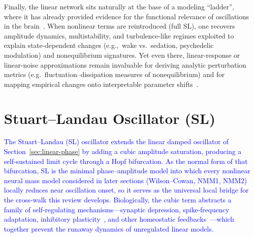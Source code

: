 \documentclass[12pt]{article}
\numberwithin{equation}{section}
\newcommand{\rev}[1]{\textcolor{blue}{#1}}
\begin{document}
Finally, the linear network sits naturally at the base of a modeling “ladder”, where it has already provided evidence for the functional relevance of oscillations in the brain~\cite{effenbergerFunctionalRoleOscillatory2025}. When nonlinear terms are reintroduced (full SL), one recovers amplitude dynamics, multistability, and turbulence-like regimes exploited to explain state-dependent changes (e.g.,\ wake vs.\ sedation, psychedelic modulation) and nonequilibrium signatures. Yet even there, linear-response or linear-noise approximations remain invaluable for deriving analytic perturbation metrics (e.g.\ fluctuation–dissipation measures of nonequilibrium) and for mapping empirical changes onto interpretable parameter shifts~\cite{Deco2023,cabral2024remote, deco2020modeling,decoTurbulentlikeDynamicsHuman2020,ponce-alvarezHopfWholebrainModel2024}.





\section{Stuart–Landau Oscillator (SL)} \label{sec:Stuart-Landau}
\begin{tcolorbox}[colback=gray!6,colframe=gray!6,enlarge left by=0mm,
  boxrule=0pt,enhanced, sharp corners]

  \rev{The Stuart--Landau (SL) oscillator extends the linear damped oscillator of Section~\ref{sec:linear-phase} by adding a cubic amplitude saturation, producing a self-sustained limit cycle through a Hopf bifurcation. As the normal form of that bifurcation, SL is the minimal phase--amplitude model into which every nonlinear neural mass model considered in later sections (Wilson--Cowan, NMM1, NMM2) locally reduces near oscillation onset, so it serves as the universal local bridge for the cross-walk this review develops. Biologically, the cubic term abstracts a family of self-regulating mechanisms---synaptic depression, spike-frequency adaptation, inhibitory plasticity~\cite{vogels_2011}, and other homeostatic feedbacks~\cite{nicola_2018,aldarabsah_2024}---which together prevent the runaway dynamics of unregulated linear models.}
 
\end{tcolorbox}
\end{document}
